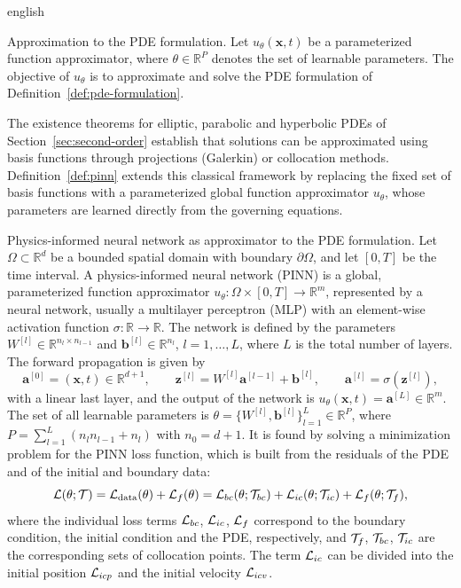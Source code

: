 \documentclass[../0000.tex]{subfiles}
\begin{document}
\begin{hyphenrules}{english}
\begin{definicion}{Approximation to the PDE formulation.}\label{def:pde-approx}
Let $u_\theta(\mathbf{x},t)$ be a parameterized function approximator, where $\theta\in\mathbb{R}^P$ denotes the set of
learnable parameters. The objective of $u_\theta$ is to approximate and solve the PDE formulation of
Definition~\ref{def:pde-formulation}.
\end{definicion}

The existence theorems for elliptic, parabolic and hyperbolic PDEs of Section~\ref{sec:second-order} establish
that solutions can be approximated using basis functions through projections (Galerkin) or collocation
methods. Definition~\ref{def:pinn} extends this classical framework by replacing the fixed set of basis functions
with a parameterized global function approximator $u_\theta$, whose parameters are learned directly from
the governing equations.

\begin{definicion}{Physics-informed neural network as approximator to the PDE formulation.}\label{def:pinn}
Let $\Omega\subset\mathbb{R}^d$ be a bounded spatial domain with boundary $\partial\Omega$, and let $[0,T]$ be
the time interval. A physics-informed neural network (PINN) is a global, parameterized function
approximator $u_\theta:\Omega\times[0,T]\to\mathbb{R}^{m}$, represented by a neural network, usually a
multilayer perceptron (MLP) with an element-wise activation function $\sigma:\mathbb{R}\to\mathbb{R}$. The network is
defined by the parameters $W^{[l]}\in\mathbb{R}^{n_l\times n_{l-1}}$ and $\mathbf{b}^{[l]}\in\mathbb{R}^{n_l}$,
$l=1,\dots,L$, where $L$ is the total number of layers. The forward propagation is given by
\cite{goodfellow2016}
\[
  \mathbf{a}^{[0]}=(\mathbf{x},t)\in\mathbb{R}^{d+1},\qquad
  \mathbf{z}^{[l]}=W^{[l]}\mathbf{a}^{[l-1]}+\mathbf{b}^{[l]},\qquad
  \mathbf{a}^{[l]}=\sigma(\mathbf{z}^{[l]}),
\]
with a linear last layer, and the output of the network is $u_\theta(\mathbf{x},t)=\mathbf{a}^{[L]}\in\mathbb{R}^m$. The
set of all learnable parameters is $\theta=\{W^{[l]},\mathbf{b}^{[l]}\}_{l=1}^{L}\in\mathbb{R}^{P}$, where
$P=\sum_{l=1}^{L}(n_ln_{l-1}+n_l)$ with $n_0=d+1$. It is found by solving a minimization problem for the
PINN loss function, which is built from the residuals of the PDE and of the initial and boundary data:
\[
  \mathcal{L}(\theta;\mathcal{T})=\mathcal{L}_{\mathrm{data}}(\theta)+\mathcal{L}_f(\theta)
  =\mathcal{L}_{bc}(\theta;\mathcal{T}_{bc})+\mathcal{L}_{ic}(\theta;\mathcal{T}_{ic})+\mathcal{L}_f(\theta;\mathcal{T}_f),
\]
where the individual loss terms $\mathcal{L}_{bc}$, $\mathcal{L}_{ic}$, $\mathcal{L}_f$ correspond to the boundary
condition, the initial condition and the PDE, respectively, and $\mathcal{T}_f$, $\mathcal{T}_{bc}$, $\mathcal{T}_{ic}$ are the
corresponding sets of collocation points. The term $\mathcal{L}_{ic}$ can be divided into the initial
position $\mathcal{L}_{icp}$ and the initial velocity $\mathcal{L}_{icv}$.
\end{definicion}


\end{hyphenrules}
\end{document}
